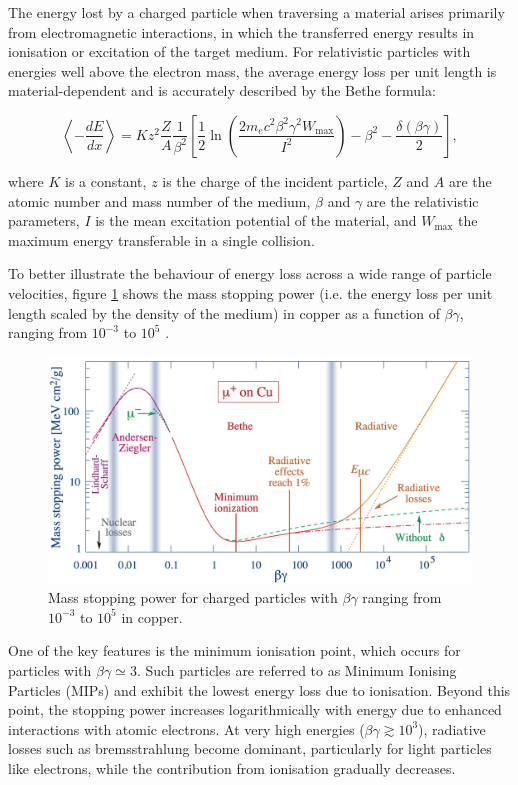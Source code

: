 	 	The energy lost by a charged particle when traversing a material arises primarily from electromagnetic interactions, in which the transferred energy results in ionisation or excitation of the target medium. For relativistic particles with energies well above the electron mass, the average energy loss per unit length is material-dependent and is accurately described by the Bethe formula:

		\begin{equation}
			\left\langle -\frac{dE}{dx} \right\rangle = K z^2 \frac{Z}{A} \frac{1}{\beta^2} \left[ \frac{1}{2} \ln\left( \frac{2 m_e c^2 \beta^2 \gamma^2 W_{\text{max}}}{I^2} \right) - \beta^2 - \frac{\delta(\beta \gamma)}{2} \right],
		\end{equation}

		where $K$ is a constant, $z$ is the charge of the incident particle, $Z$ and $A$ are the atomic number and mass number of the medium, $\beta$ and $\gamma$ are the relativistic parameters, $I$ is the mean excitation potential of the material, and $W_{\text{max}}$ the maximum energy transferable in a single collision.

		To better illustrate the behaviour of energy loss across a wide range of particle velocities, figure \ref{im:bethe_bloch} shows the mass stopping power (i.e. the energy loss per unit length scaled by the density of the medium) in copper as a function of $\beta \gamma$, ranging from $10^{-3}$ to $10^5$ \cite{PDG}.

		\begin{figure}[h]
			\centering
			\includegraphics[width=0.85\linewidth]{files/bethe_bloch}
			\caption{Mass stopping power for charged particles with $\beta \gamma$ ranging from $10^{-3}$ to $10^5$ in copper.}
			\label{im:bethe_bloch}
		\end{figure}

		One of the key features is the minimum ionisation point, which occurs for particles with $\beta \gamma \simeq 3$. Such particles are referred to as Minimum Ionising Particles (MIPs) and exhibit the lowest energy loss due to ionisation. Beyond this point, the stopping power increases logarithmically with energy due to enhanced interactions with atomic electrons. At very high energies ($\beta \gamma \gtrsim 10^3$), radiative losses such as bremsstrahlung become dominant, particularly for light particles like electrons, while the contribution from ionisation gradually decreases.

